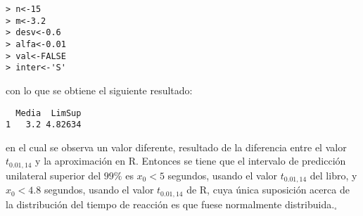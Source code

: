 \begin{solucion}
\begin{enumerate}
  \begin{verbatim}
> n<-15
> m<-3.2
> desv<-0.6
> alfa<-0.01
> val<-FALSE
> inter<-'S'
  \end{verbatim}
  \vspace{-0.5cm}
  con lo que se obtiene el siguiente resultado:
  \begin{verbatim}
  Media  LimSup
1   3.2 4.82634
  \end{verbatim}
  \vspace{-0.5cm}
  en el cual se observa un valor diferente, resultado de la diferencia entre el valor $t_{0.01,14}$ y la aproximaci\'on en R. Entonces se tiene que el intervalo de predicci\'on unilateral superior del $99\%$ es $x_0 < 5$ segundos, usando el valor $t_{0.01,14}$ del libro, y $x_0 < 4.8$ segundos, usando el valor $t_{0.01,14}$ de R, cuya \'unica suposici\'on acerca de la distribuci\'on del tiempo de reacci\'on es que fuese normalmente distribuida.${}_{\square}$
  

\end{enumerate}
\end{solucion}
